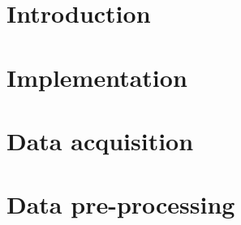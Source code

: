 \documentclass[12pt]{report}
\begin{document}



%
%

\tableofcontents{}
\listoffigures
\listoftables

\chapter{Introduction}





\chapter{Implementation}


\chapter{Data acquisition}


\chapter{Data pre-processing}


% 

% 

% 

% 

% 
\end{document}
